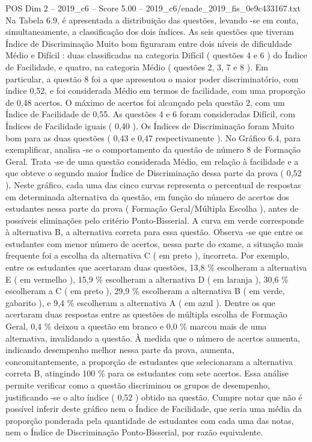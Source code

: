 \begin{textsample}{POS Dim 2 – 2019\_c6 – Score 5.00 – 2019\_c6/enade\_2019\_fis\_0e9c433167.txt}
Na Tabela 6.9, é apresentada a distribuição das questões, levando -se em conta, simultaneamente, a classificação dos dois índices.
As seis questões que tiveram Índice de Discriminação Muito bom figuraram entre dois níveis de dificuldade Médio e Difícil : duas classificadas na categoria Difícil ( questões 4 e 6 ) do Índice de Facilidade, e quatro, na categoria Médio ( questões 2, 3, 7 e 8 ).
Em particular, a questão 8 foi a que apresentou o maior poder discriminatório, com índice 0,52, e foi considerada Médio em termos de facilidade, com uma proporção de 0,48 acertos.
O máximo de acertos foi alcançado pela questão 2, com um Índice de Facilidade de 0,55.
As questões 4 e 6 foram consideradas Difícil, com Índices de Facilidade iguais ( 0,40 ).
Os Índices de Discriminação foram Muito bom para as duas questões ( 0,43 e 0,47 respectivamente ).
No Gráfico 6.4, para exemplificar, analisa -se o comportamento da questão de número 8 de Formação Geral.
Trata -se de uma questão considerada Médio, em relação à facilidade e a que obteve o segundo maior Índice de Discriminação dessa parte da prova ( 0,52 ).
Neste gráfico, cada uma das cinco curvas representa o percentual de respostas em determinada alternativa da questão, em função do número de acertos dos estudantes nessa parte da prova ( Formação Geral/Múltipla Escolha ), antes de possíveis eliminações pelo critério Ponto-Bisserial.
A curva em verde corresponde à alternativa B, a alternativa correta para essa questão.
Observa -se que entre os estudantes com menor número de acertos, nessa parte do exame, a situação mais frequente foi a escolha da alternativa C ( em preto ), incorreta.
Por exemplo, entre os estudantes que acertaram duas questões, 13,8 \% escolheram a alternativa E ( em vermelho ), 15,9 \% escolheram a alternativa D ( em laranja ), 30,6 \% escolheram a C ( em preto ), 29,9 \% escolheram a alternativa B ( em verde, gabarito ), e 9,4 \% escolheram a alternativa A ( em azul ).
Dentre os que acertaram duas respostas entre as questões de múltipla escolha de Formação Geral, 0,4 \% deixou a questão em branco e 0,0 \% marcou mais de uma alternativa, invalidando a questão.
À medida que o número de acertos aumenta, indicando desempenho melhor nessa parte da prova, aumenta, concomitantemente, a proporção de estudantes que selecionaram a alternativa correta B, atingindo 100 \% para os estudantes com sete acertos.
Essa análise permite verificar como a questão discriminou os grupos de desempenho, justificando -se o alto índice ( 0,52 ) obtido na questão.
Cumpre notar que não é possível inferir deste gráfico nem o Índice de Facilidade, que seria uma média da proporção ponderada pela quantidade de estudantes com cada uma das notas, nem o Índice de Discriminação Ponto-Bisserial, por razão equivalente.

\end{textsample}
